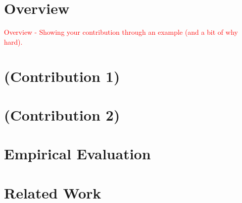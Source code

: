 \documentclass[acmsmall,review,authorversion]{acmart}
\begin{document}
\section{Overview}
\textcolor{red}{
Overview
- Showing your contribution through an example (and a bit of why hard).
}

\section{(Contribution 1)}

\section{(Contribution 2)}

\section{Empirical Evaluation}

\section{Related Work}
\end{document}
